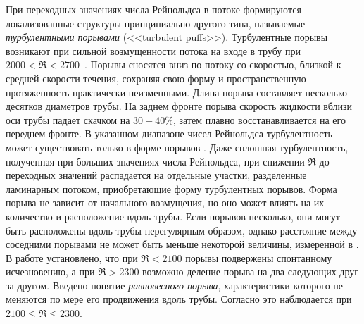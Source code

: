 При переходных значениях числа Рейнольдса в потоке формируются локализованные структуры принципиально другого типа, называемые {\it турбулентными порывами} (<<turbulent puffs>>). Турбулентные порывы возникают при сильной возмущенности потока на входе в трубу при $2000<\Re<2700$~\cite{Wygnanski1973}. Порывы сносятся вниз по потоку со скоростью, близкой к средней скорости течения, сохраняя свою форму и пространственную протяженность практически неизменными. Длина порыва составляет несколько десятков диаметров трубы. На заднем фронте порыва скорость жидкости вблизи оси трубы падает скачком на $30-40\%$, затем плавно восстанавливается на его переднем фронте. В указанном диапазоне чисел Рейнольдса турбулентность может существовать только в форме порывов \cite{vanDoorne2009, Moxey2010, Samanta2011}. Даже сплошная турбулентность, полученная при больших значениях числа Рейнольдса, при снижении $\Re$ до переходных значений распадается на отдельные участки, разделенные ламинарным потоком, приобретающие форму турбулентных порывов. Форма порыва не зависит от начального возмущения, но оно может влиять на их количество и расположение вдоль трубы. Если порывов несколько, они могут быть расположены вдоль трубы нерегулярным образом, однако расстояние между соседними порывами не может быть меньше некоторой величины, измеренной в \cite{Samanta2011}. В работе \cite{Wygnanski1975} установлено, что при $\Re<2100$ порывы подвержены спонтанному исчезновению, а при $\Re>2300$ возможно деление порыва на два следующих друг за другом. Введено понятие {\it равновесного порыва}, характеристики которого не меняются по мере его продвижения вдоль трубы. Согласно \cite{Wygnanski1975} это наблюдается при $2100\leqslant \Re \leqslant 2300$. 

